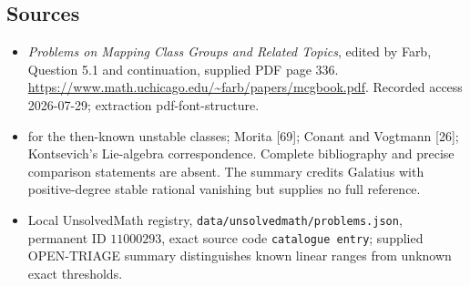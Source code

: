 \documentclass[11pt]{article}
\begin{document}
\subsection{Sources}
\begin{itemize}
\item \emph{Problems on Mapping Class Groups and Related Topics}, edited by Farb, Question 5.1 and continuation, supplied PDF page 336. \url{https://www.math.uchicago.edu/~farb/papers/mcgbook.pdf}. Recorded access 2026-07-29; extraction pdf-font-structure.
\item [49, 26] for the then-known unstable classes; Morita [69]; Conant and Vogtmann [26]; Kontsevich's Lie-algebra correspondence. Complete bibliography and precise comparison statements are absent. The summary credits Galatius with positive-degree stable rational vanishing but supplies no full reference.
\item Local UnsolvedMath registry, \texttt{data/unsolvedmath/problems.json}, permanent ID \(11000293\), exact source code \texttt{catalogue entry}; supplied OPEN-TRIAGE summary distinguishes known linear ranges from unknown exact thresholds.
\end{itemize}
\end{document}
